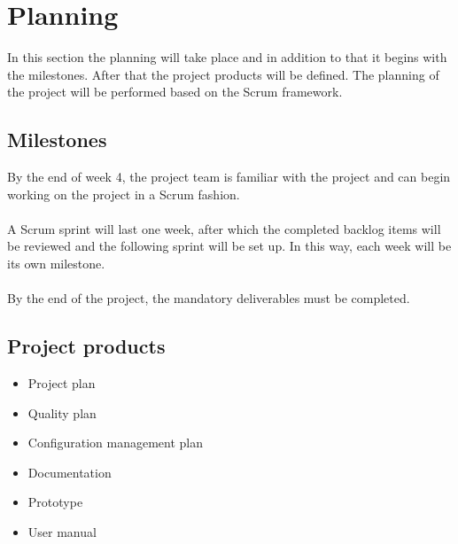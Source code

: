 \section{Planning}
In this section the planning will take place and in addition to that it begins with the milestones.
After that the project products will be defined. The planning of the project will be performed based on the Scrum framework.

    \subsection{Milestones}
    By the end of week 4, the project team is familiar with the project and can begin working on the project in a Scrum fashion.\\\\
    A Scrum sprint will last one week, after which the completed backlog items will be reviewed and the following sprint will be set up. In this way, each week will be its own milestone.\\\\
    By the end of the project, the mandatory deliverables must be completed.
    
    \subsection{Project products}
    \begin{itemize}
        \item Project plan
        \item Quality plan
        \item Configuration management plan
        \item Documentation
        \item Prototype
        \item User manual
    \end{itemize}